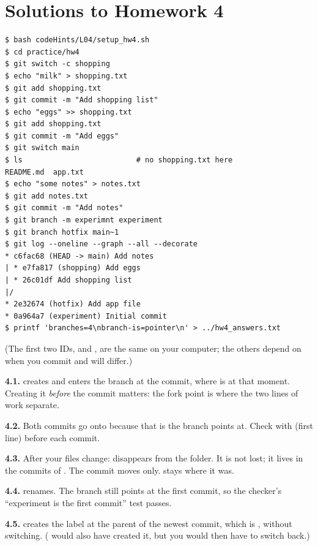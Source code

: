 \section*{Solutions to Homework 4}

\begin{lstlisting}
$ bash codeHints/L04/setup_hw4.sh
$ cd practice/hw4
$ git switch -c shopping
$ echo "milk" > shopping.txt
$ git add shopping.txt
$ git commit -m "Add shopping list"
$ echo "eggs" >> shopping.txt
$ git add shopping.txt
$ git commit -m "Add eggs"
$ git switch main
$ ls                          # no shopping.txt here
README.md  app.txt
$ echo "some notes" > notes.txt
$ git add notes.txt
$ git commit -m "Add notes"
$ git branch -m experimnt experiment
$ git branch hotfix main~1
$ git log --oneline --graph --all --decorate
* c6fac68 (HEAD -> main) Add notes
| * e7fa817 (shopping) Add eggs
| * 26c01df Add shopping list
|/
* 2e32674 (hotfix) Add app file
* 0a964a7 (experiment) Initial commit
$ printf 'branches=4\nbranch-is=pointer\n' > ../hw4_answers.txt
\end{lstlisting}

(The first two IDs,  and , are the same on your computer; the others depend on when you commit and will differ.)

\textbf{4.1.}  creates and enters the branch at the  commit, where  is at that moment. Creating it \emph{before} the  commit matters: the fork point is where the two lines of work separate.

\textbf{4.2.} Both commits go onto  because that is the branch  points at. Check with  (first line) before each commit.

\textbf{4.3.} After  your files change:  disappears from the folder. It is not lost; it lives in the commits of . The  commit moves  only.  stays where it was.

\textbf{4.4.}  renames. The branch still points at the first commit, so the checker's ``experiment is the first commit'' test passes.

\textbf{4.5.}  creates the label at the parent of the newest  commit, which is , without switching. ( would also have created it, but you would then have to switch back.)

